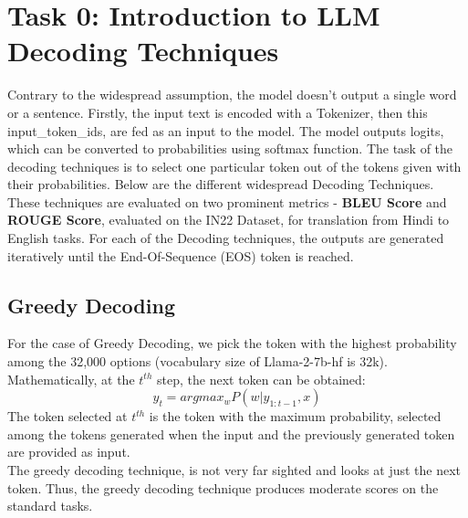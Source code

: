 \documentclass{article}
\begin{document}
\section{Task 0: Introduction to LLM Decoding Techniques}
Contrary to the widespread assumption, the model doesn't output a single word or a sentence. Firstly, the input text is encoded with a Tokenizer, then this input\_token\_ids, are fed as an input to the model. The model outputs logits, which can be converted to probabilities using softmax function. The task of the decoding techniques is to select one particular token out of the tokens given with their probabilities. \newline
Below are the different widespread Decoding Techniques. These techniques are evaluated on two prominent metrics - \textbf{BLEU Score} and \textbf{ROUGE Score}, evaluated on the IN22 Dataset, for translation from Hindi to English tasks. For each of the Decoding techniques, the outputs are generated iteratively until the End-Of-Sequence (EOS) token is reached.

\subsection{Greedy Decoding}
For the case of Greedy Decoding, we pick the token with the highest probability among the 32,000 options (vocabulary size of Llama-2-7b-hf is 32k). Mathematically, at the $t^{th}$ step, the next token can be obtained:
\begin{equation}
    y_t = arg max_{w} P(w | y_{1:t-1}, x)
\end{equation}
The token selected at $t^{th}$ is the token with the maximum probability, selected among the tokens generated when the input and the previously generated token are provided as input. \\
The greedy decoding technique, is not very far sighted and looks at just the next token. Thus, the greedy decoding technique produces moderate scores on the standard tasks.
\end{document}
